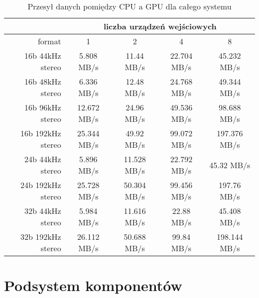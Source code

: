 \begin{table}[H]
    \begin{center}
        \caption{Przesył danych pomiędzy CPU a GPU dla całego systemu}
        \label{tab:Przesył danych pomiędzy CPU a GPU dla całego systemu}
        \begin{tabular}{r|c|c|c|c}
                               & \multicolumn{4}{c}{liczba urządzeń wejściowych}        \\
            \hline
            format             &     1       &     2      &      4      &     8         \\
            \hline
            16b 44kHz stereo   & 5.808 MB/s  & 11.44 MB/s & 22.704 MB/s & 45.232 MB/s   \\
            16b 48kHz stereo   & 6.336 MB/s  & 12.48 MB/s & 24.768 MB/s & 49.344 MB/s   \\
            16b 96kHz stereo   & 12.672 MB/s & 24.96 MB/s & 49.536 MB/s & 98.688 MB/s   \\
            16b 192kHz stereo  & 25.344 MB/s & 49.92 MB/s & 99.072 MB/s & 197.376 MB/s  \\
            \hline
            24b 44kHz stereo   & 5.896 MB/s  & 11.528 MB/s & 22.792 MB/s & 45.32 MB/s   \\
            24b 192kHz stereo  & 25.728 MB/s & 50.304 MB/s & 99.456 MB/s & 197.76 MB/s  \\
            \hline
            32b 44kHz stereo   & 5.984 MB/s  & 11.616 MB/s & 22.88 MB/s & 45.408 MB/s   \\
            32b 192kHz stereo  & 26.112 MB/s & 50.688 MB/s & 99.84 MB/s & 198.144 MB/s  \\
        \end{tabular}
    \end{center}
\end{table}


\section{Podsystem komponentów}

